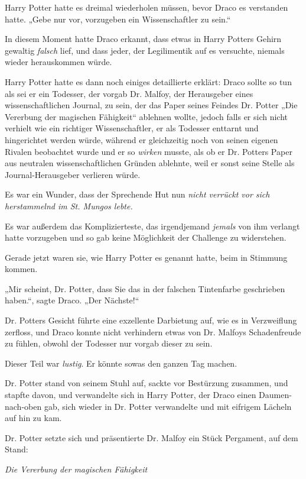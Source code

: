 {Harry Potter hatte es dreimal wiederholen müssen, bevor Draco es verstanden hatte. „Gebe nur vor, vorzugeben ein Wissenschaftler zu sein.“

In diesem Moment hatte Draco erkannt, dass etwas in Harry Potters Gehirn gewaltig \emph{falsch} lief, und dass jeder, der Legilimentik auf es versuchte, niemals wieder herauskommen würde.

Harry Potter hatte es dann noch einiges detaillierte erklärt: Draco sollte so tun als sei er ein Todesser, der vorgab Dr. Malfoy, der Herausgeber eines wissenschaftlichen Journal, zu sein, der das Paper seines Feindes Dr. Potter „Die Vererbung der magischen Fähigkeit“ ablehnen wollte, jedoch falls er sich nicht verhielt wie ein richtiger Wissenschaftler, er als Todesser enttarnt und hingerichtet werden würde, während er gleichzeitig noch von seinen eigenen Rivalen beobachtet wurde und er so \emph{wirken} musste, als ob er Dr. Potters Paper aus neutralen wissenschaftlichen Gründen ablehnte, weil er sonst seine Stelle als Journal-Herausgeber verlieren würde.

Es war ein Wunder, dass der Sprechende Hut nun \emph{nicht verrückt vor sich herstammelnd im St. Mungos lebte.}

Es war außerdem das Komplizierteste, das irgendjemand \emph{jemals} von ihm verlangt hatte vorzugeben und so gab keine Möglichkeit der Challenge zu widerstehen.

Gerade jetzt waren sie, wie Harry Potter es genannt hatte, beim in Stimmung kommen.

„Mir scheint, Dr. Potter, dass Sie das in der falschen Tintenfarbe geschrieben haben.“, sagte Draco. „Der Nächste!“

Dr. Potters Gesicht führte eine exzellente Darbietung auf, wie es in Verzweiflung zerfloss, und Draco konnte nicht verhindern etwas von Dr. Malfoys Schadenfreude zu fühlen, obwohl der Todesser nur vorgab dieser zu sein.

Dieser Teil war \emph{lustig}. Er könnte sowas den ganzen Tag machen.

Dr. Potter stand von seinem Stuhl auf, sackte vor Bestürzung zusammen, und stapfte davon, und verwandelte sich in Harry Potter, der Draco einen Daumen-nach-oben gab, sich wieder in Dr. Potter verwandelte und mit eifrigem Lächeln auf hin zu kam.

Dr. Potter setzte sich und präsentierte Dr. Malfoy ein Stück Pergament, auf dem Stand:

\emph{Die Vererbung der magischen Fähigkeit}

}

